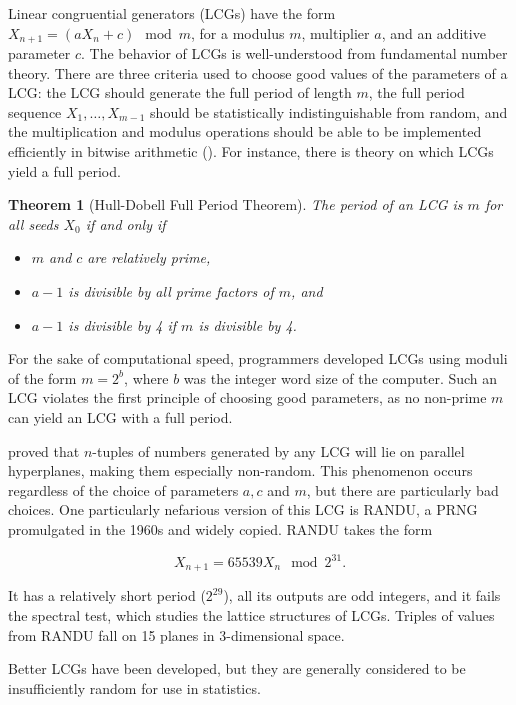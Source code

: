 \documentclass[12pt]{article}
\newtheorem{theorem}{Theorem}[section]
\newcommand{\todo}[1]{{\color{red}{TO DO: \sc #1}}}
\begin{document}
Linear congruential generators (LCGs) have the form $X_{n+1} = (a X_n + c) \mod m$, for a modulus $m$, 
multiplier $a$, and an additive parameter $c$.
The behavior of LCGs is well-understood from fundamental number theory.
There are three criteria used to choose good values of the parameters of a LCG:
the LCG should generate the full period of length $m$,
the full period sequence $X_1, \dots, X_{m-1}$ should be statistically indistinguishable from random,
and the multiplication and modulus operations should be able to be implemented efficiently in bitwise arithmetic (\cite{hornfeck_multiplicative_2009}).
For instance, there is theory on which LCGs yield a full period. \todo{cite theorem}

\begin{theorem}[Hull-Dobell Full Period Theorem]
\label{thm:hull_dobell_period}
The period of an LCG is $m$ for all seeds $X_0$ if and only if
\begin{itemize}
\item $m$ and $c$ are relatively prime,
\item $a-1$ is divisible by all prime factors of $m$, and
\item $a-1$ is divisible by 4 if $m$ is divisible by 4.
\end{itemize}
\end{theorem}

For the sake of computational speed, programmers developed LCGs using moduli of the form $m = 2^b$, where
$b$ was the integer word size of the computer.
Such an LCG violates the first principle of choosing good parameters, as no non-prime $m$ can yield an LCG with a full period.


\citet{marsaglia_random_1968} proved that $n$-tuples of numbers generated by any LCG will lie on parallel hyperplanes, making them especially non-random.
This phenomenon occurs regardless of the choice of parameters $a, c$ and $m$, but there are particularly bad choices.
One particularly nefarious version of this LCG is RANDU, a PRNG promulgated in the 1960s and widely copied. 
RANDU takes the form

$$X_{n+1} = 65539 X_n \mod 2^{31}.$$

It has a relatively short period ($2^{29}$), all its outputs are odd integers, and it fails the spectral test, which studies the lattice structures of LCGs.
Triples of values from RANDU fall on 15 planes in 3-dimensional space.
\todo{mention RANDU blowing up science, finding erroneous crystallographic structure}

Better LCGs have been developed, but they are generally considered to be insufficiently random for use in statistics.
\todo{mention and cite some, say Super-Duper}
\end{document}
